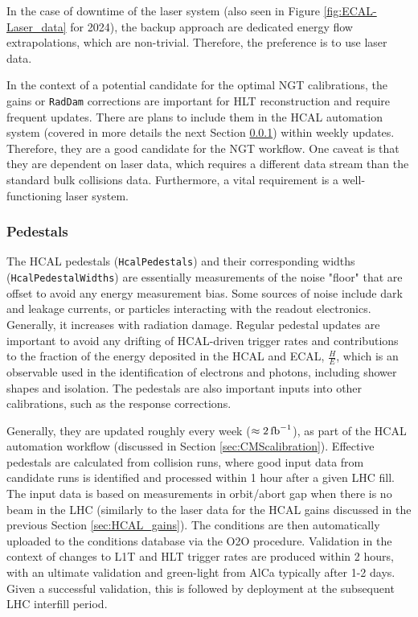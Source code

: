 In the case of downtime of the laser system (also seen in Figure \ref{fig:ECAL-Laser_data} for 2024), the backup approach are dedicated energy flow extrapolations, which are non-trivial. Therefore, the preference is to use laser data.

In the context of a potential candidate for the optimal NGT calibrations, the gains or \texttt{RadDam} corrections are important for HLT reconstruction and require frequent updates. There are plans to include them in the HCAL automation system (covered in more details the next Section \ref{sec:HCAL_pedestals}) within weekly updates. Therefore, they are a good candidate for the NGT workflow. One caveat is that they are dependent on laser data, which requires a different data stream than the standard bulk collisions data. Furthermore, a vital requirement is a well-functioning laser system.

\subsubsection{Pedestals}\label{sec:HCAL_pedestals}
The HCAL pedestals (\texttt{HcalPedestals}) and their corresponding widths (\texttt{HcalPedestalWidths}) are essentially measurements of the noise "floor" that are offset to avoid any energy measurement bias. Some sources of noise include dark and leakage currents, or particles interacting with the readout electronics. Generally, it increases with radiation damage. Regular pedestal updates are important to avoid any drifting of HCAL-driven trigger rates and contributions to the fraction of the energy deposited in the HCAL and ECAL, $\frac{H}{E}$, which is an observable used in the identification of electrons and photons, including shower shapes and isolation. The pedestals are also important inputs into other calibrations, such as the response corrections.

Generally, they are updated roughly every week ($\approx 2 \mbox{\ensuremath{\,\text{fb}^{-1}}}$), as part of the HCAL automation workflow (discussed in Section \ref{sec:CMScalibration}). Effective pedestals are calculated from collision runs, where good input data from candidate runs is identified and processed within 1 hour after a given LHC fill. The input data is based on measurements in orbit/abort gap when there is no beam in the LHC (similarly to the laser data for the HCAL gains discussed in the previous Section \ref{sec:HCAL_gains}). The conditions are then automatically uploaded to the conditions database via the O2O procedure. Validation in the context of changes to L1T and HLT trigger rates are produced within 2 hours, with an ultimate validation and green-light from AlCa typically after 1-2 days. Given a successful validation, this is followed by deployment at the subsequent LHC interfill period.

